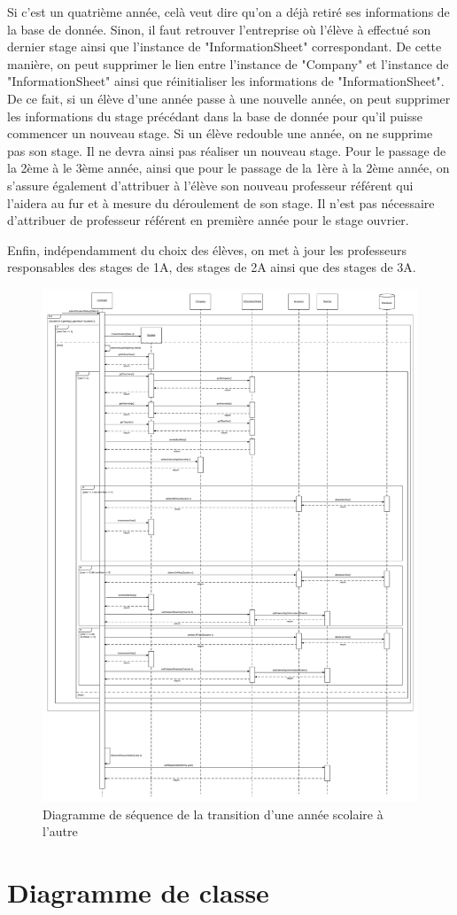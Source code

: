 \documentclass{scrreprt}
\begin{document}
	Si c'est un quatrième année, celà veut dire qu'on a déjà retiré ses informations de la base de donnée. Sinon, il faut retrouver 
l'entreprise où l'élève à effectué son dernier stage ainsi que l'instance de "InformationSheet" correspondant. De cette manière, on peut 
supprimer le lien entre l'instance de "Company" et l'instance de "InformationSheet" ainsi que réinitialiser les informations de 
"InformationSheet". De ce fait, si un élève d'une année passe à une nouvelle année, on peut supprimer les informations du stage précédant 
dans la base de donnée pour qu'il puisse commencer un nouveau stage. Si un élève redouble une année, on ne supprime pas son stage. Il ne 
devra ainsi pas réaliser un nouveau stage. Pour le passage de la 2ème à le 3ème année, ainsi que pour le passage de la 1ère à la 2ème année, 
on s'assure également d'attribuer à l'élève son nouveau professeur référent qui l'aidera au fur et à mesure du déroulement de son stage. 
Il n'est pas nécessaire d'attribuer de professeur référent en première année pour le stage ouvrier. 

	Enfin, indépendamment du choix des élèves, on met à jour les professeurs responsables des stages de 1A, des stages de 2A ainsi que 
des stages de 3A.  

\newpage
\begin{figure}[h]
\centering
\includegraphics[width=15cm]{images/newYearSeqDiag.png}
\caption{Diagramme de séquence de la transition d'une année scolaire à l'autre}
\end{figure}

\newpage
\chapter{Diagramme de classe}


\end{document}
